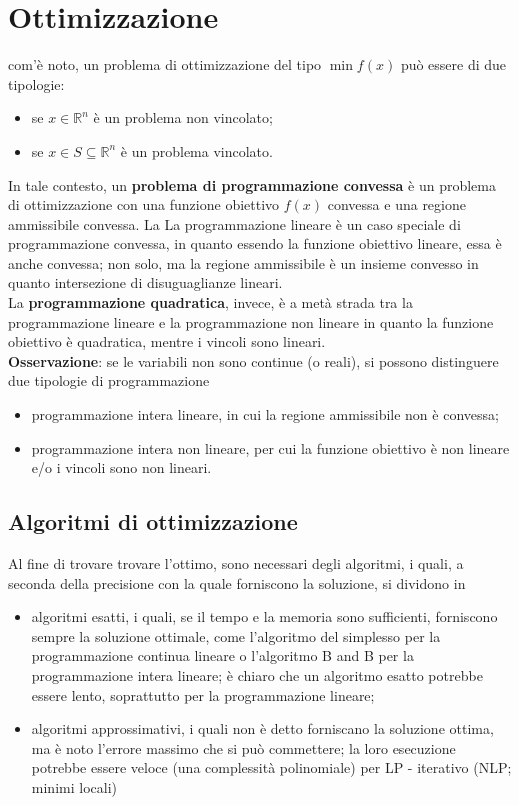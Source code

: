 \documentclass[a4paper]{extarticle}
\begin{document}
\newpage
\section{Ottimizzazione}
com'è noto, un problema di ottimizzazione del tipo $\min f(x)$ può essere di due tipologie:
\begin{itemize}
    \item se $x \in \mathbb{R}^n$ è un problema non vincolato;
    \item se $x \in S \subseteq \mathbb{R}^n$ è un problema vincolato.
\end{itemize}
In tale contesto, un \textbf{problema di programmazione convessa} è un problema di ottimizzazione con una funzione obiettivo $f(x)$ convessa e una regione ammissibile convessa.
La La programmazione lineare è un caso speciale di programmazione convessa, in quanto essendo la funzione obiettivo lineare, essa è anche convessa; non solo, ma la regione ammissibile è un insieme convesso in quanto intersezione di disuguaglianze lineari.\\
La \textbf{programmazione quadratica}, invece, è a metà strada tra la programmazione lineare e la programmazione non lineare in quanto la funzione obiettivo è quadratica, mentre i vincoli sono lineari.\\

\vspace{1em}
\noindent
\textbf{Osservazione}: se le variabili non sono continue (o reali), si possono distinguere due tipologie di programmazione
\begin{itemize}
    \item programmazione intera lineare, in cui la regione ammissibile non è convessa;
    \item programmazione intera non lineare, per cui la funzione obiettivo è non lineare e/o i vincoli sono non lineari.
\end{itemize}

\vspace{1em}
\subsection{Algoritmi di ottimizzazione}
Al fine di trovare trovare l'ottimo, sono necessari degli algoritmi, i quali, a seconda della precisione con la quale forniscono la soluzione, si dividono in
\begin{itemize}
    \item algoritmi esatti, i quali, se il tempo e la memoria sono sufficienti, forniscono sempre la soluzione ottimale, come l'algoritmo del simplesso per la programmazione continua lineare o l'algoritmo B and B per la programmazione intera lineare; è chiaro che un algoritmo esatto potrebbe essere lento, soprattutto per la programmazione lineare;
    \item algoritmi approssimativi, i quali non è detto forniscano la soluzione ottima, ma è noto l'errore massimo che si può commettere; la loro esecuzione potrebbe essere veloce (una complessità polinomiale) per LP - iterativo (NLP; minimi locali)
\end{itemize}
\end{document}

